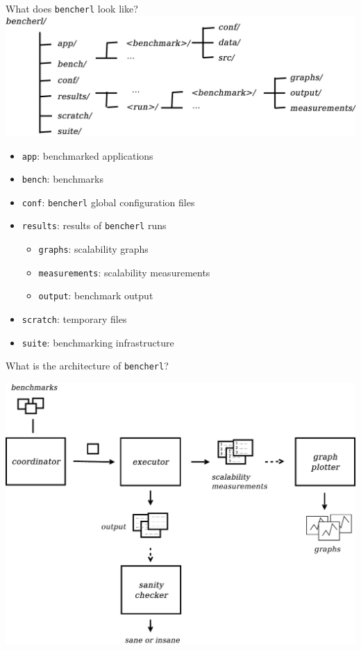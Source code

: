 \documentclass{beamer}
\begin{document}
\begin{frame}{What does \texttt{bencherl} look like?}
\includegraphics[width=\linewidth]{figures/structure.pdf}
	\begin{itemize}
		\item \texttt{app}: benchmarked applications
		\item \texttt{bench}: benchmarks
		\item \texttt{conf}: \texttt{bencherl} global configuration files
		\item \texttt{results}: results of \texttt{bencherl} runs 
			\begin{itemize}
				\item \texttt{graphs}: scalability graphs
				\item \texttt{measurements}: scalability measurements
				\item \texttt{output}: benchmark output
			\end{itemize}
		\item \texttt{scratch}: temporary files
		\item \texttt{suite}: benchmarking infrastructure
	\end{itemize}
\end{frame}

\begin{frame}{What is the architecture of \texttt{bencherl}?}
	\begin{center}
		\includegraphics[width=0.8\linewidth]{figures/architecture.pdf}
	\end{center}
\end{frame}
\end{document}
